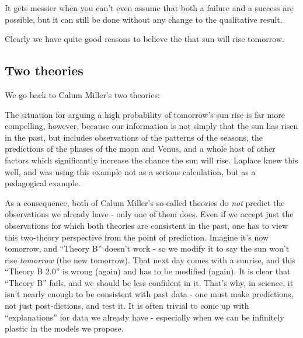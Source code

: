 It gets
messier when you can't even assume that both a failure and a success
are possible, but it can
still be done without any change to the qualitative result.

Clearly we have quite good reasons to believe the that sun will rise
tomorrow.

\subsection{Two theories}\label{two-theories}

We go back to Calum Miller's two theories:


The situation for arguing a high probability of tomorrow's sun rise is
far more compelling, however, because our information is not simply that
the sun has risen in the past, but includes observations of the patterns
of the seasons, the predictions of the phases of the moon and Venus, and
a whole host of other factors which significantly increase the chance
the sun will rise. Laplace knew this well, and was using this example
not as a serious calculation, but as a pedagogical example.

As a consequence, both of Calum Miller's so-called theories do \emph{not}
predict the observations we already have - only one of them does. Even
if we accept just the observations for which both theories are
consistent in the past, one has to view this two-theory perspective from
the point of prediction. Imagine it's now tomorrow, and ``Theory B'' doesn't work - so we modify it to say the sun won't rise \emph{tomorrow} (the new tomorrow). That next day comes with a sunrise, and this ``Theory B 2.0'' is wrong (again) and has to be modified (again). It is clear that ``Theory B'' fails, and we should be less confident in it. That's why, in science, it isn't nearly enough to be consistent with past data - one must make predictions, not just post-dictions, and test it. It is often trivial to come up with ``explanations'' for data we already have - especially when we can be infinitely plastic in the models we propose. 



